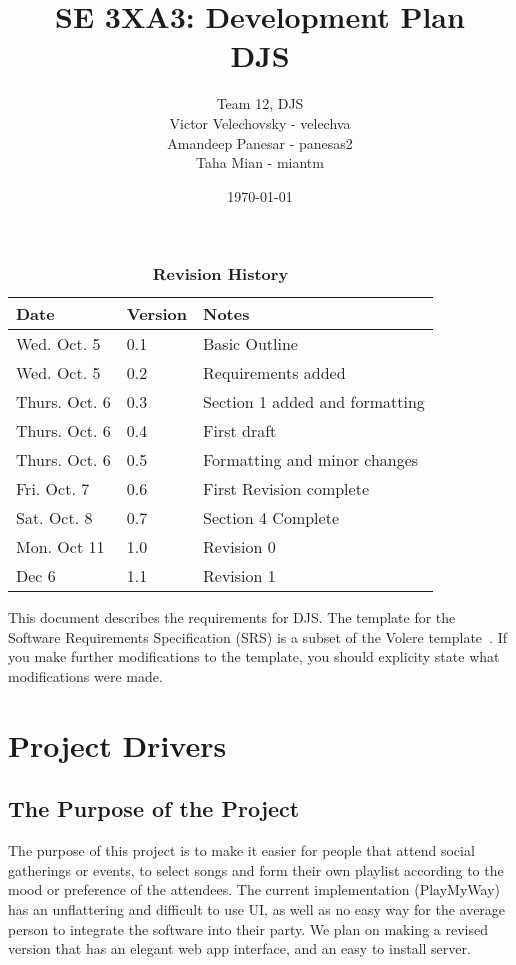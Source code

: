 \documentclass[12pt, titlepage]{article}
\title{SE 3XA3: Development Plan\\DJS}
\author{Team 12, DJS
	\\ Victor Velechovsky - velechva
	\\ Amandeep Panesar - panesas2
	\\ Taha Mian - miantm
}
\date{\today}
\begin{document}
\maketitle

\tableofcontents
\listoftables
\listoffigures

\begin{table}[bp]
\caption{\bf Revision History}
\begin{tabularx}{\textwidth}{p{3cm}p{2cm}X}
\toprule {\bf Date} & {\bf Version} & {\bf Notes}\\
\midrule
Wed. Oct. 5 & 0.1 & Basic Outline \\
Wed. Oct. 5 & 0.2 & Requirements added \\
Thurs. Oct. 6 & 0.3 & Section 1 added and formatting \\
Thurs. Oct. 6 & 0.4 & First draft \\
Thurs. Oct. 6 & 0.5 & Formatting and minor changes \\
Fri. Oct. 7 & 0.6 & First Revision complete \\
Sat. Oct. 8 & 0.7 & Section 4 Complete\\
Mon. Oct 11 & 1.0 & Revision 0\\
Dec 6 & 1.1 & Revision 1\\
\bottomrule
\end{tabularx}
\end{table}

\newpage


This document describes the requirements for DJS.  The template for the Software
Requirements Specification (SRS) is a subset of the Volere
template~\citep{RobertsonAndRobertson2012}.  If you make further modifications
to the template, you should explicity state what modifications were made.

\section{Project Drivers}

\subsection{The Purpose of the Project}
The purpose of this project is to make it easier for people that attend social
gatherings or events, to select songs and form their own playlist according to
the mood or preference of the attendees. The current implementation (PlayMyWay)
has an unflattering and difficult to use UI, as well as no easy way for the
average person to integrate the software into their party. We plan on making a
revised version that has an elegant web app interface, and an easy to install
server.
\end{document}
